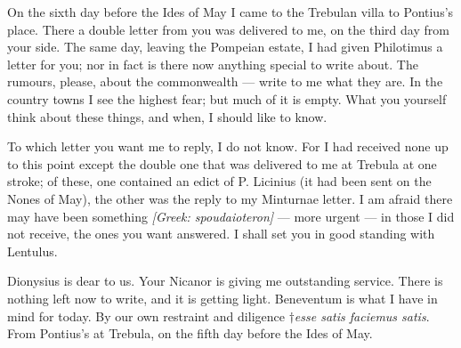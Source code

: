 

 On the sixth day before the Ides of May I came to the Trebulan villa to Pontius's place. There a double letter from you was delivered to me, on the third day from your side. The same day, leaving the Pompeian estate, I had given Philotimus a letter for you; nor in fact is there now anything special to write about. The rumours, please, about the commonwealth --- write to me what they are. In the country towns I see the highest fear; but much of it is empty. What you yourself think about these things, and when, I should like to know.

 To which letter you want me to reply, I do not know. For I had received none up to this point except the double one that was delivered to me at Trebula at one stroke; of these, one contained an edict of P. Licinius (it had been sent on the Nones of May), the other was the reply to my Minturnae letter. I am afraid there may have been something \textit{[Greek: spoudaioteron]} --- more urgent --- in those I did not receive, the ones you want answered. I shall set you in good standing with Lentulus.

 Dionysius is dear to us. Your Nicanor is giving me outstanding service. There is nothing left now to write, and it is getting light. Beneventum is what I have in mind for today. By our own restraint and diligence \textit{$\dagger$esse satis faciemus satis}. From Pontius's at Trebula, on the fifth day before the Ides of May.

